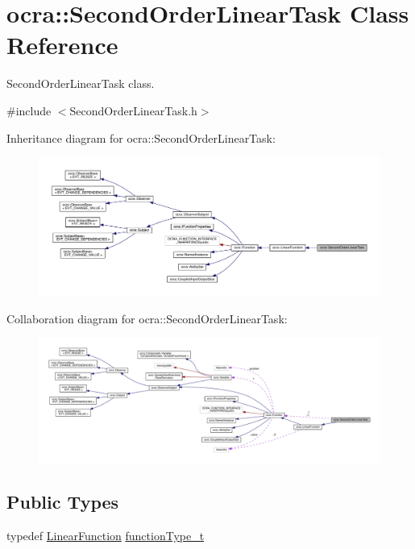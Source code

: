 \hypertarget{classocra_1_1SecondOrderLinearTask}{}\section{ocra\+:\+:Second\+Order\+Linear\+Task Class Reference}
\label{classocra_1_1SecondOrderLinearTask}


Second\+Order\+Linear\+Task class.  




{\ttfamily \#include $<$Second\+Order\+Linear\+Task.\+h$>$}



Inheritance diagram for ocra\+:\+:Second\+Order\+Linear\+Task\+:\nopagebreak
\begin{figure}[H]
\begin{center}
\leavevmode
\includegraphics[width=350pt]{d6/dec/classocra_1_1SecondOrderLinearTask__inherit__graph}
\end{center}
\end{figure}


Collaboration diagram for ocra\+:\+:Second\+Order\+Linear\+Task\+:\nopagebreak
\begin{figure}[H]
\begin{center}
\leavevmode
\includegraphics[width=350pt]{de/d45/classocra_1_1SecondOrderLinearTask__coll__graph}
\end{center}
\end{figure}
\subsection*{Public Types}
\begin{DoxyCompactItemize}
\item 
typedef \hyperlink{classocra_1_1LinearFunction}{Linear\+Function} \hyperlink{classocra_1_1SecondOrderLinearTask_aa4843b0b2ad21ecba7decb2be86c6214}{function\+Type\+\_\+t}
\end{DoxyCompactItemize}
